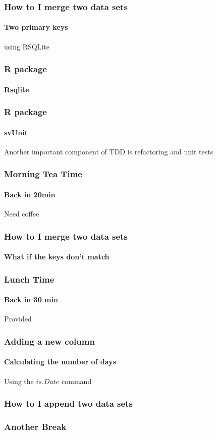 \documentclass[12pt]{beamer}\usepackage[]{graphicx}\usepackage[]{color}
\begin{document}
\begin{frame}
  \frametitle{How to I merge two data sets}
  \framesubtitle{Two primary keys}
  using RSQLite
\end{frame}


\begin{frame}
  \frametitle{R package}
  \framesubtitle{Rsqlite}
\end{frame}

\begin{frame}
  \frametitle{R package}
  \framesubtitle{svUnit}
     Another important component of TDD is refactoring and unit tests
\end{frame}

\begin{frame}
  \frametitle{Morning Tea Time}
  \framesubtitle{Back in 20min}
  Need coffee
\end{frame}

\begin{frame}
  \frametitle{How to I merge two data sets}
  \framesubtitle{What if the keys don't match}
\end{frame}

\begin{frame}
  \frametitle{Lunch Time}
  \framesubtitle{Back in 30 min}
  Provided
\end{frame}

\begin{frame}
  \frametitle{Adding a new column}
  \framesubtitle{Calculating the number of days}
  Using the $is.Date$ command
\end{frame}

\begin{frame}
  \frametitle{How to I append two data sets}
\end{frame}
\begin{frame}
  \frametitle{Another Break}
\end{frame}
\end{document}
